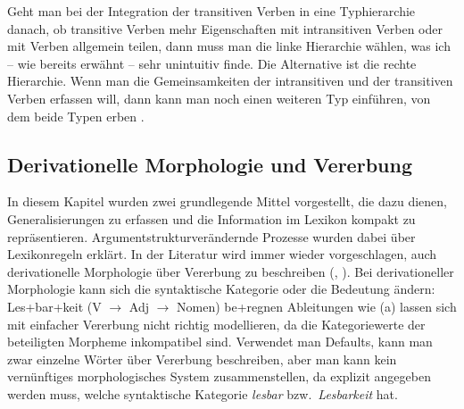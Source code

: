 Geht man bei der Integration der transitiven Verben in eine Typhierarchie danach,
ob transitive Verben mehr Eigenschaften mit intransitiven Verben oder mit Verben
allgemein teilen, dann muss man die linke Hierarchie wählen, was ich -- wie bereits erwähnt --
sehr unintuitiv finde. Die Alternative ist die rechte Hierarchie. Wenn man die Gemeinsamkeiten der
intransitiven und der transitiven Verben erfassen will, dann kann man noch einen weiteren Typ
einführen, von dem beide Typen erben \citep[]{ps}. 



\subsection{Derivationelle Morphologie und Vererbung}
\label{sec-derivation-vererbung}

%
In diesem Kapitel wurden zwei grundlegende Mittel vorgestellt, die dazu dienen,
Generalisierungen zu erfassen und die Information im Lexikon kompakt zu repräsentieren.
Argumentstrukturverändernde Prozesse wurden dabei über Lexikonregeln erklärt. In der Literatur
wird immer wieder vorgeschlagen, auch derivationelle Morphologie über Vererbung zu beschreiben
(\citealp*[]{RCWA91a}, \citealp{MR2001a}).
Bei derivationeller Morphologie kann sich die syntaktische Kategorie oder die Bedeutung ändern:
\eal
\ex Les+bar+keit (V $\to$ Adj $\to$ Nomen)
\ex be+regnen
\zl
Ableitungen wie (a) lassen sich mit einfacher Vererbung nicht richtig modellieren, da
die Kategoriewerte der beteiligten Morpheme inkompatibel sind. Verwendet man Defaults, kann man
zwar einzelne Wörter über Vererbung beschreiben, aber man kann kein vernünftiges morphologisches
System zusammenstellen, da explizit angegeben werden muss, welche syntaktische Kategorie \emph{lesbar}
bzw.\ \emph{Lesbarkeit} hat.

